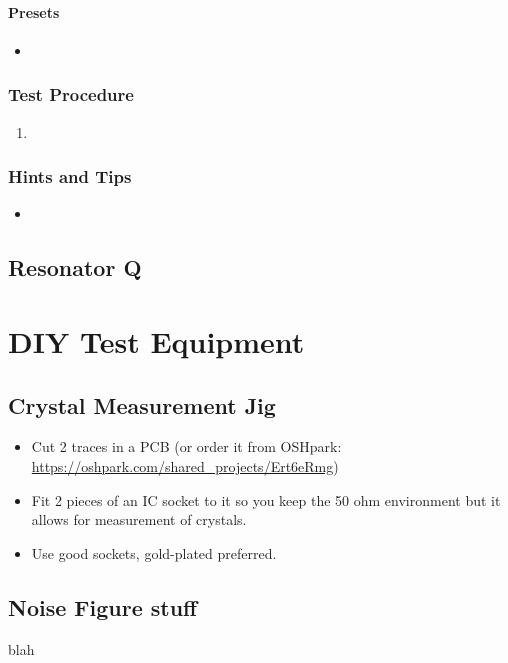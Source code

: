 \documentclass[10pt,letterpaper]{book}
\begin{document}
\subsubsection*{Presets}
\begin{itemize}
	\item
\end{itemize}
\subsection*{Test Procedure}
\begin{enumerate}
	\item  
\end{enumerate}

\subsection*{Hints and Tips}
\begin{itemize}
	\item
\end{itemize}


\section{Resonator Q}
\chapter{DIY Test Equipment}
\section{Crystal Measurement Jig}
\begin{itemize}
	\item Cut 2 traces in a PCB (or order it from OSHpark: \url{https://oshpark.com/shared_projects/Ert6eRmg})
	\item  Fit 2 pieces of an IC socket to it so you keep the 50 ohm environment but it allows for measurement of crystals.
	\item Use good sockets, gold-plated preferred.  
\end{itemize}
\section{Noise Figure stuff}
blah
\end{document}

